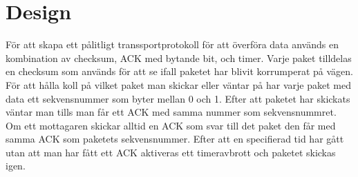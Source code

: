 \section{Design}
För att skapa ett pålitligt transsportprotokoll för att överföra data används en kombination av checksum, ACK med bytande bit, och timer. Varje paket tilldelas en checksum som används för att se ifall paketet har blivit korrumperat på vägen. För att hålla koll på vilket paket man skickar eller väntar på har varje paket med data ett sekvensnummer som byter mellan 0 och 1. Efter att paketet har skickats väntar man tills man får ett ACK med samma nummer som sekvensnummret. Om ett mottagaren skickar alltid en ACK som svar till det paket den får med samma ACK som paketets sekvensnummer. 
Efter att en specifierad tid har gått utan att man har fått ett ACK aktiveras ett timeravbrott och paketet skickas igen.
